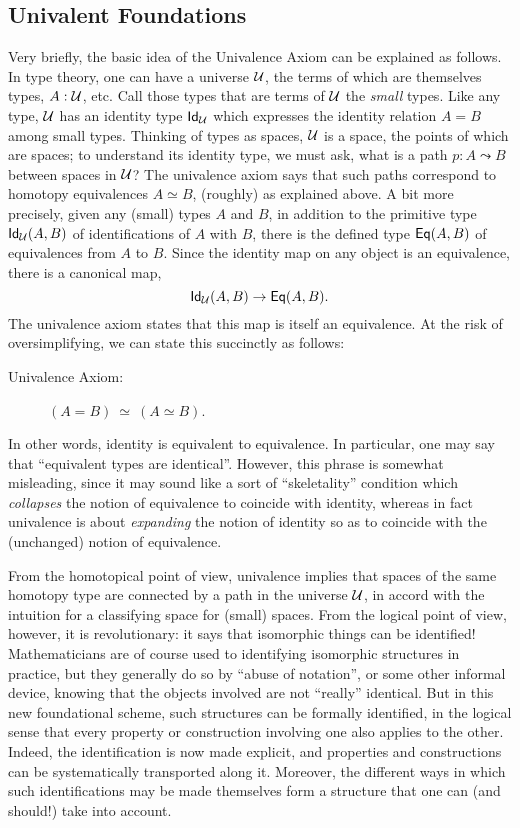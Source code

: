{\subsection*{Univalent Foundations}

Very briefly, the basic idea of the Univalence Axiom can be explained as follows.  In type theory, one can have a universe $\mathcal{U}$, the terms of which are themselves types, $A : \mathcal{U}$, etc.  Call those types that are terms of $\mathcal{U}$ the \emph{small} types.  Like any type, $\mathcal{U}$ has an identity type ${{\sf Id}}_{\mathcal{U}}$ which expresses the identity relation $A = B$ among small types.  Thinking of types as spaces, $\mathcal{U}$ is a space, the points of which are spaces; to understand its identity type, we must ask, what is a path $p : A \leadsto B$ between spaces in $\mathcal{U}$?  The univalence axiom says that such paths correspond to homotopy equivalences $A\simeq B$, (roughly) as explained above.  A bit more precisely, given any (small) types $A$ and $B$, in addition to the primitive type ${{\sf Id}}_{\mathcal{U}}(A,B)$ of identifications of $A$ with $B$, there is the defined type ${{\sf Eq}}(A,B)$ of equivalences from $A$ to $B$.  Since the identity map on any object is an equivalence, there is a canonical map,
$${{\sf Id}}_{\mathcal{U}}(A,B)\to{{\sf Eq}}(A,B).$$
The univalence axiom states that this map is itself an equivalence.  At the risk of oversimplifying, we can state this succinctly as follows:

\begin{description}
\item[Univalence Axiom:]  $(A = B)\ \simeq\ (A\simeq B)$.
\end{description}
%
In other words, identity is equivalent to equivalence. 
In particular, one may say that ``equivalent types are identical''.
However, this phrase is somewhat misleading, since it may sound like a sort of ``skeletality'' condition which \emph{collapses} the notion of equivalence to coincide with identity, whereas in fact univalence is about \emph{expanding} the notion of identity so as to coincide with the (unchanged) notion of equivalence.

From the homotopical point of view, univalence implies that spaces of the same homotopy type are connected by a path in the universe $\mathcal{U}$, in accord with the intuition for a classifying space for (small) spaces.
From the logical point of view, however, it is revolutionary: it says that isomorphic things can be identified!  Mathematicians are of course used to identifying isomorphic structures in practice, but they generally do so by ``abuse of notation'', or some other informal device, knowing that the objects involved are not ``really'' identical.  But in this new foundational scheme, such structures can be formally identified, in the logical sense that every property or construction involving one also applies to the other. Indeed, the identification is now made explicit, and properties and constructions can be systematically transported along it.  Moreover, the different ways in which such identifications may be made themselves form a structure that one can (and should!) take into account.

}
